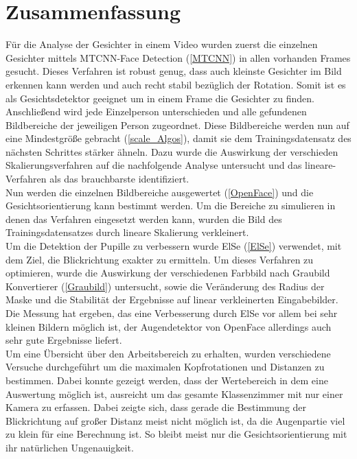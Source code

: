\section{Zusammenfassung}

Für die Analyse der Gesichter in einem Video wurden zuerst die einzelnen Gesichter mittels MTCNN-Face Detection (\autoref{MTCNN}) in allen vorhanden Frames gesucht. Dieses Verfahren ist robust genug, dass auch kleinste Gesichter im Bild erkennen kann werden und auch recht stabil bezüglich der Rotation. Somit ist es als Gesichtsdetektor geeignet um in einem Frame die Gesichter zu finden.\\

Anschließend wird jede Einzelperson unterschieden und alle gefundenen Bildbereiche der jeweiligen Person zugeordnet. Diese Bildbereiche werden nun auf eine Mindestgröße gebracht (\autoref{scale_Algos}), damit sie dem Trainingsdatensatz des nächsten Schrittes stärker ähneln. Dazu wurde die Auswirkung der verschieden Skalierungsverfahren auf die nachfolgende Analyse untersucht und das lineare-Verfahren als das brauchbarste identifiziert.\\

Nun werden die einzelnen Bildbereiche ausgewertet (\autoref{OpenFace}) und die Gesichtsorientierung kann bestimmt werden. Um die Bereiche zu simulieren in denen das Verfahren eingesetzt werden kann, wurden die Bild des Trainingsdatensatzes durch lineare Skalierung verkleinert.\\

Um die Detektion der Pupille zu verbessern wurde ElSe (\autoref{ElSe}) verwendet, mit dem Ziel, die Blickrichtung exakter zu ermitteln. Um dieses Verfahren zu optimieren, wurde die Auswirkung der verschiedenen Farbbild nach Graubild Konvertierer (\autoref{Graubild}) untersucht, sowie die Veränderung des Radius der Maske und die Stabilität der Ergebnisse auf linear verkleinerten Eingabebilder. Die Messung hat ergeben, das eine Verbesserung durch ElSe vor allem bei sehr kleinen Bildern möglich ist, der Augendetektor von OpenFace allerdings auch sehr gute Ergebnisse liefert.\\

Um eine Übersicht über den Arbeitsbereich zu erhalten, wurden verschiedene Versuche durchgeführt um die maximalen Kopfrotationen und Distanzen zu bestimmen. Dabei konnte gezeigt werden, dass der Wertebereich in dem eine Auswertung möglich ist, ausreicht um das gesamte Klassenzimmer mit nur einer Kamera zu erfassen. Dabei zeigte sich, dass gerade die Bestimmung der Blickrichtung auf großer Distanz meist nicht möglich ist, da die Augenpartie viel zu klein für eine Berechnung ist. So bleibt meist nur die Gesichtsorientierung mit ihr natürlichen Ungenauigkeit.\\

